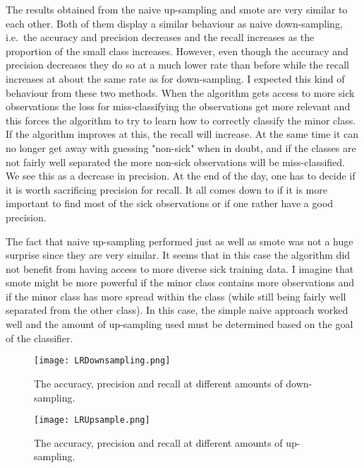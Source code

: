 \documentclass[11pt,twoside,swedish]{article}
\begin{document}
The results obtained from the naive up-sampling and smote are very
similar to each other. Both of them display a similar behaviour as
naive down-sampling, i.e.\ the accuracy and precision decreases and
the recall increases as the proportion of the small class
increases. However, even though the accuracy and precision decreases
they do so at a much lower rate than before while the recall increases
at about the same rate as for down-sampling. I expected this kind of
behaviour from these two methods. When the algorithm gets access to
more sick observations the loss for miss-classifying the observations
get more relevant and this forces the algorithm to try to learn how to
correctly classify the minor class. If the algorithm improves at this,
the recall will increase. At the same time it can no longer get away
with guessing "non-sick" when in doubt, and if the classes are not
fairly well separated the more non-sick observations will be
miss-classified. We see this as a decrease in precision. At the end of
the day, one has to decide if it is worth sacrificing precision for
recall. It all comes down to if it is more important to find most of
the sick observations or if one rather have a good precision.

The fact that naive up-sampling performed just as well as smote was
not a huge surprise since they are very similar. It seems that in this
case the algorithm did not benefit from having access to more diverse
sick training data. I imagine that smote might be more powerful if the
minor class contains more observations and if the minor class has more
spread within the class (while still being fairly well separated from
the other class). In this case, the simple naive approach worked well
and the amount of up-sampling used must be determined based on the
goal of the classifier. 

\graphicspath{{/home/mikael/Repos/Courses/msa220/Mini/Mini/Mini_3/}}
\begin{figure}
\begin{center}
\texttt{[image: LRDownsampling.png]}
\caption{The accuracy, precision and recall at different amounts of down-sampling.}
\label{mini 3 down-sampling}
\end{center}
\end{figure}

\begin{figure}
\begin{center}
\texttt{[image: LRUpsample.png]}
\caption{The accuracy, precision and recall at different amounts of up-sampling.}
\label{mini 3 up-sampling}
\end{center}
\end{figure}
\end{document}
